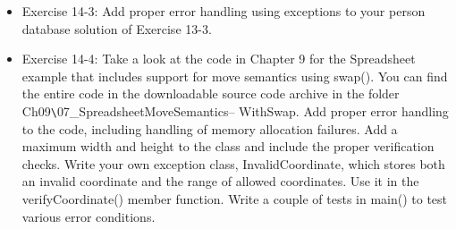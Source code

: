 \begin{itemize}
\item
Exercise 14-3: Add proper error handling using exceptions to your person database solution of Exercise 13-3.

\item
Exercise 14-4: Take a look at the code in Chapter 9 for the Spreadsheet example that includes support for move semantics using swap(). You can find the entire code in the downloadable source code archive in the folder Ch09\verb|\|07\_SpreadsheetMoveSemantics– WithSwap. Add proper error handling to the code, including handling of memory allocation failures. Add a maximum width and height to the class and include the proper verification checks. Write your own exception class, InvalidCoordinate, which stores both an invalid coordinate and the range of allowed coordinates. Use it in the verifyCoordinate() member function. Write a couple of tests in main() to test various error conditions.
\end{itemize}














